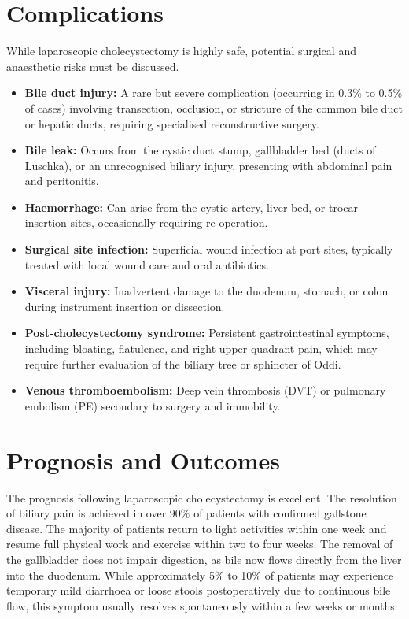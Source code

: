\section*{Complications}
While laparoscopic cholecystectomy is highly safe, potential surgical and anaesthetic risks must be discussed.
\begin{itemize}
    \item \textbf{Bile duct injury:} A rare but severe complication (occurring in 0.3\% to 0.5\% of cases) involving transection, occlusion, or stricture of the common bile duct or hepatic ducts, requiring specialised reconstructive surgery.
    \item \textbf{Bile leak:} Occurs from the cystic duct stump, gallbladder bed (ducts of Luschka), or an unrecognised biliary injury, presenting with abdominal pain and peritonitis.
    \item \textbf{Haemorrhage:} Can arise from the cystic artery, liver bed, or trocar insertion sites, occasionally requiring re-operation.
    \item \textbf{Surgical site infection:} Superficial wound infection at port sites, typically treated with local wound care and oral antibiotics.
    \item \textbf{Visceral injury:} Inadvertent damage to the duodenum, stomach, or colon during instrument insertion or dissection.
    \item \textbf{Post-cholecystectomy syndrome:} Persistent gastrointestinal symptoms, including bloating, flatulence, and right upper quadrant pain, which may require further evaluation of the biliary tree or sphincter of Oddi.
    \item \textbf{Venous thromboembolism:} Deep vein thrombosis (DVT) or pulmonary embolism (PE) secondary to surgery and immobility.
\end{itemize}

\section*{Prognosis and Outcomes}
The prognosis following laparoscopic cholecystectomy is excellent. The resolution of biliary pain is achieved in over 90\% of patients with confirmed gallstone disease. The majority of patients return to light activities within one week and resume full physical work and exercise within two to four weeks. The removal of the gallbladder does not impair digestion, as bile now flows directly from the liver into the duodenum. While approximately 5\% to 10\% of patients may experience temporary mild diarrhoea or loose stools postoperatively due to continuous bile flow, this symptom usually resolves spontaneously within a few weeks or months.

